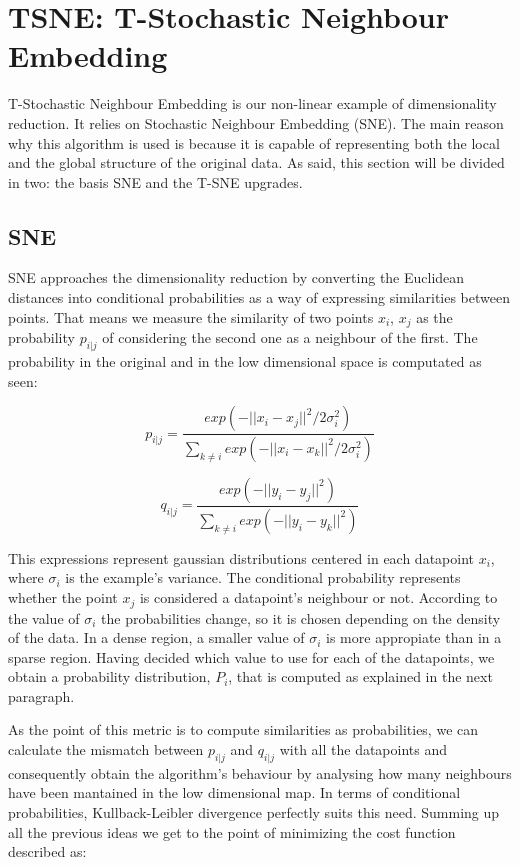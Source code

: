 \documentclass[a4paper,11pt,spanish]{report}
\begin{document}
\section{TSNE: T-Stochastic Neighbour Embedding}
\label{sec:tsne}

T-Stochastic Neighbour Embedding \citep{tsne} is our non-linear example of dimensionality reduction. It relies on Stochastic Neighbour Embedding (SNE). The main reason why this algorithm is used is because it is capable of representing both the local and the global structure of the original data. As said, this section will be divided in two: the basis SNE and the T-SNE upgrades.

\subsection{SNE}
\label{ssec:sne}

SNE approaches the dimensionality reduction by converting the Euclidean distances into conditional probabilities as a way of expressing similarities between points. That means we measure the similarity of two points $x_{i}$, $x_{j}$ as the probability $p_{i|j}$ of considering the second one as a neighbour of the first. The probability in the original and in the low dimensional space is computated as seen:

$$ p_{i|j} = \frac{exp(-||x_{i}-x_{j}||^{2}/2\sigma_{i}^{2})}{\sum _{k\neq i} exp (-||x_{i}-x_{k}||^{2}/2\sigma_{i}^{2})}$$

$$ q_{i|j} = \frac{exp(-||y_{i}-y_{j}||^{2})}{\sum _{k\neq i} exp (-||y_{i}-y_{k}||^{2})} $$

This expressions represent gaussian distributions centered in each datapoint $x_{i}$, where $\sigma_{i}$ is the example's variance. The conditional probability represents whether the point $x_{j}$ is considered a datapoint's neighbour or not. According to the value of $\sigma_{i}$ the probabilities change, so it is chosen depending on the density of the data. In a dense region, a smaller value of $\sigma_{i}$ is more appropiate than in a sparse region. Having decided which value to use for each of the datapoints, we obtain a probability distribution, $P_{i}$, that is computed as explained in the next paragraph.

As the point of this metric is to compute similarities as probabilities, we can calculate the mismatch between $p_{i|j}$ and $q_{i|j}$ with all the datapoints and consequently obtain the algorithm's behaviour by analysing how many neighbours have been mantained in the low dimensional map. In terms of conditional probabilities, Kullback-Leibler divergence perfectly suits this need. Summing up all the previous ideas we get to the point of minimizing the cost function described as:
\end{document}
